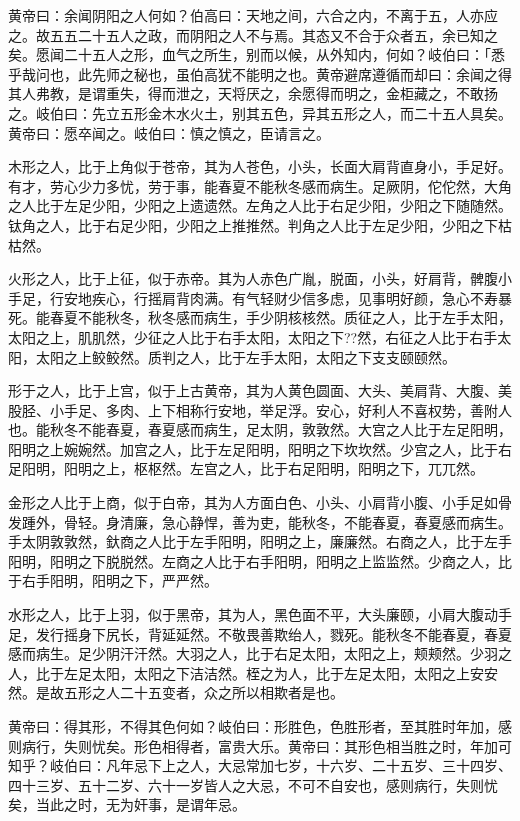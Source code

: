 \documentclass[12pt,UTF8]{ctexbook}
\begin{document}
	黄帝曰：余闻阴阳之人何如？伯高曰：天地之间，六合之内，不离于五，人亦应之。故五五二十五人之政，而阴阳之人不与焉。其态又不合于众者五，余已知之矣。愿闻二十五人之形，血气之所生，别而以候，从外知内，何如？岐伯曰：「悉乎哉问也，此先师之秘也，虽伯高犹不能明之也。黄帝避席遵循而却曰：余闻之得其人弗教，是谓重失，得而泄之，天将厌之，余愿得而明之，金柜藏之，不敢扬之。岐伯曰：先立五形金木水火土，别其五色，异其五形之人，而二十五人具矣。黄帝曰：愿卒闻之。岐伯曰：慎之慎之，臣请言之。
	
	木形之人，比于上角似于苍帝，其为人苍色，小头，长面大肩背直身小，手足好。有才，劳心少力多忧，劳于事，能春夏不能秋冬感而病生。足厥阴，佗佗然，大角之人比于左足少阳，少阳之上遗遗然。左角之人比于右足少阳，少阳之下随随然。钛角之人，比于右足少阳，少阳之上推推然。判角之人比于左足少阳，少阳之下枯枯然。
	
	火形之人，比于上征，似于赤帝。其为人赤色广胤，脱面，小头，好肩背，髀腹小手足，行安地疾心，行摇肩背肉满。有气轻财少信多虑，见事明好颜，急心不寿暴死。能春夏不能秋冬，秋冬感而病生，手少阴核核然。质征之人，比于左手太阳，太阳之上，肌肌然，少征之人比于右手太阳，太阳之下??然，右征之人比于右手太阳，太阳之上鲛鲛然。质判之人，比于左手太阳，太阳之下支支颐颐然。
	
	形于之人，比于上宫，似于上古黄帝，其为人黄色圆面、大头、美肩背、大腹、美股胫、小手足、多肉、上下相称行安地，举足浮。安心，好利人不喜权势，善附人也。能秋冬不能春夏，春夏感而病生，足太阴，敦敦然。大宫之人比于左足阳明，阳明之上婉婉然。加宫之人，比于左足阳明，阳明之下坎坎然。少宫之人，比于右足阳明，阳明之上，枢枢然。左宫之人，比于右足阳明，阳明之下，兀兀然。
	
	金形之人比于上商，似于白帝，其为人方面白色、小头、小肩背小腹、小手足如骨发踵外，骨轻。身清廉，急心静悍，善为吏，能秋冬，不能春夏，春夏感而病生。手太阴敦敦然，釱商之人比于左手阳明，阳明之上，廉廉然。右商之人，比于左手阳明，阳明之下脱脱然。左商之人比于右手阳明，阳明之上监监然。少商之人，比于右手阳明，阳明之下，严严然。
	
	水形之人，比于上羽，似于黑帝，其为人，黑色面不平，大头廉颐，小肩大腹动手足，发行摇身下尻长，背延延然。不敬畏善欺绐人，戮死。能秋冬不能春夏，春夏感而病生。足少阴汗汗然。大羽之人，比于右足太阳，太阳之上，颊颊然。少羽之人，比于左足太阳，太阳之下洁洁然。桎之为人，比于左足太阳，太阳之上安安然。是故五形之人二十五变者，众之所以相欺者是也。
	
	黄帝曰：得其形，不得其色何如？岐伯曰：形胜色，色胜形者，至其胜时年加，感则病行，失则忧矣。形色相得者，富贵大乐。黄帝曰：其形色相当胜之时，年加可知乎？岐伯曰：凡年忌下上之人，大忌常加七岁，十六岁、二十五岁、三十四岁、四十三岁、五十二岁、六十一岁皆人之大忌，不可不自安也，感则病行，失则忧矣，当此之时，无为奸事，是谓年忌。
	
\end{document}
